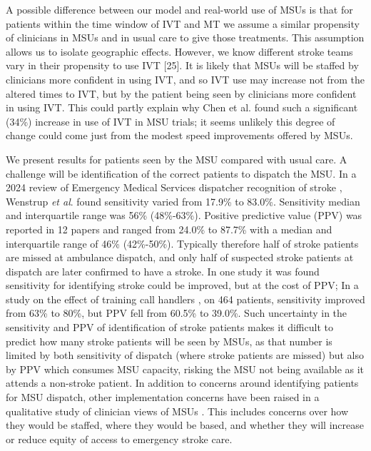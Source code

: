 A possible difference between our model and real-world use of MSUs is that for patients within the time window of IVT and MT we assume a similar propensity of clinicians in MSUs and in usual care to give those treatments. This assumption allows us to isolate geographic effects. However, we know different stroke teams vary in their propensity to use IVT [25]. It is likely that MSUs will be staffed by clinicians more confident in using IVT, and so IVT use may increase not from the altered times to IVT, but by the patient being seen by clinicians more confident in using IVT. This could partly explain why Chen et al. \cite{chen_systematic_2022} found such a significant (34\%) increase in use of IVT in MSU trials; it seems unlikely this degree of change could come just from the modest speed improvements offered by MSUs.

We present results for patients seen by the MSU compared with usual care. A challenge will be identification of the correct patients to dispatch the MSU. In a 2024 review of Emergency Medical Services dispatcher recognition of stroke \cite{wenstrup_emergency_2024}, Wenstrup \textit{et al}. found sensitivity varied from 17.9\% to 83.0\%. Sensitivity median and interquartile range was 56\% (48\%-63\%). Positive predictive value (PPV) was reported in 12 papers and ranged from 24.0\% to 87.7\% with a median and interquartile range of 46\% (42\%-50\%). Typically therefore half of stroke patients are missed at ambulance dispatch, and only half of suspected stroke patients at dispatch are later confirmed to have a stroke. In one study it was found sensitivity for identifying stroke could be improved, but at the cost of PPV; In a study on the effect of training call handlers \cite{watkins_training_2013}, on 464 patients, sensitivity improved from 63\% to 80\%, but PPV fell from 60.5\% to 39.0\%. Such uncertainty in the sensitivity and PPV of identification of stroke patients makes it difficult to predict how many stroke patients will be seen by MSUs, as that number is limited by both sensitivity of dispatch (where stroke patients are missed) but also by PPV which consumes MSU capacity, risking the MSU not being available as it attends a non-stroke patient. In addition to concerns around identifying patients for MSU dispatch, other implementation concerns have been raised in a qualitative study of clinician views of MSUs \cite{moseley_practitioner_2024}. This includes concerns over how they would be staffed, where they would be based, and whether they will increase or reduce equity of access to emergency stroke care.

